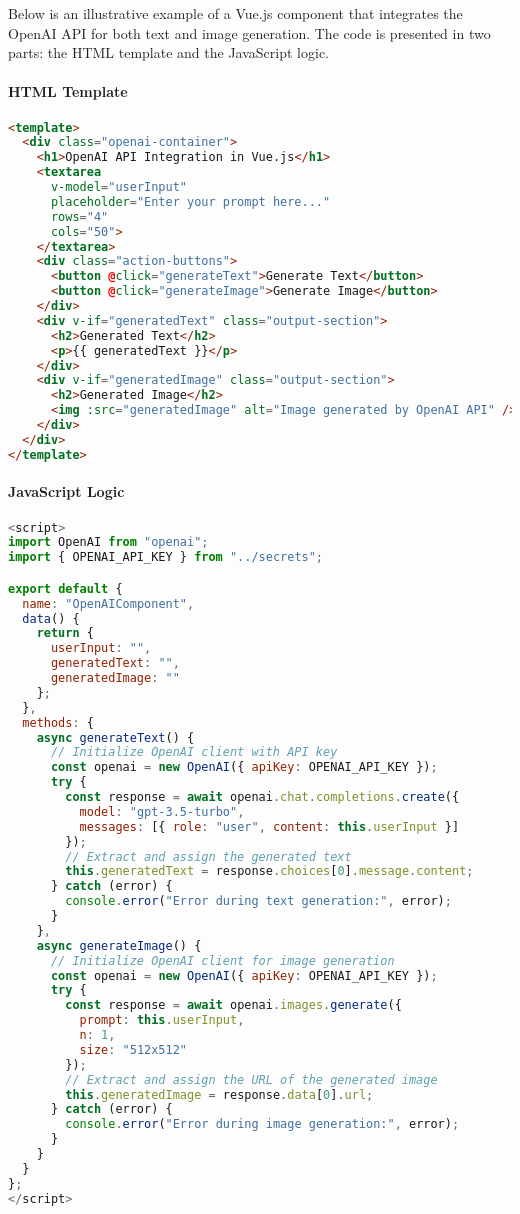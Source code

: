 Below is an illustrative example of a Vue.js component that integrates the OpenAI API for both text and image generation. The code is presented in two parts: the HTML template and the JavaScript logic.

\paragraph{HTML Template}
\begin{lstlisting}[language=HTML, caption=Vue.js Template for OpenAI API Integration]
<template>
  <div class="openai-container">
    <h1>OpenAI API Integration in Vue.js</h1>
    <textarea 
      v-model="userInput" 
      placeholder="Enter your prompt here..." 
      rows="4" 
      cols="50">
    </textarea>
    <div class="action-buttons">
      <button @click="generateText">Generate Text</button>
      <button @click="generateImage">Generate Image</button>
    </div>
    <div v-if="generatedText" class="output-section">
      <h2>Generated Text</h2>
      <p>{{ generatedText }}</p>
    </div>
    <div v-if="generatedImage" class="output-section">
      <h2>Generated Image</h2>
      <img :src="generatedImage" alt="Image generated by OpenAI API" />
    </div>
  </div>
</template>
\end{lstlisting}

\paragraph{JavaScript Logic}


\begin{lstlisting}[language=JavaScript, caption=Vue.js Script for OpenAI API Integration]
<script>
import OpenAI from "openai";
import { OPENAI_API_KEY } from "../secrets";

export default {
  name: "OpenAIComponent",
  data() {
    return {
      userInput: "",
      generatedText: "",
      generatedImage: ""
    };
  },
  methods: {
    async generateText() {
      // Initialize OpenAI client with API key
      const openai = new OpenAI({ apiKey: OPENAI_API_KEY });
      try {
        const response = await openai.chat.completions.create({
          model: "gpt-3.5-turbo",
          messages: [{ role: "user", content: this.userInput }]
        });
        // Extract and assign the generated text
        this.generatedText = response.choices[0].message.content;
      } catch (error) {
        console.error("Error during text generation:", error);
      }
    },
    async generateImage() {
      // Initialize OpenAI client for image generation
      const openai = new OpenAI({ apiKey: OPENAI_API_KEY });
      try {
        const response = await openai.images.generate({
          prompt: this.userInput,
          n: 1,
          size: "512x512"
        });
        // Extract and assign the URL of the generated image
        this.generatedImage = response.data[0].url;
      } catch (error) {
        console.error("Error during image generation:", error);
      }
    }
  }
};
</script>
\end{lstlisting}

